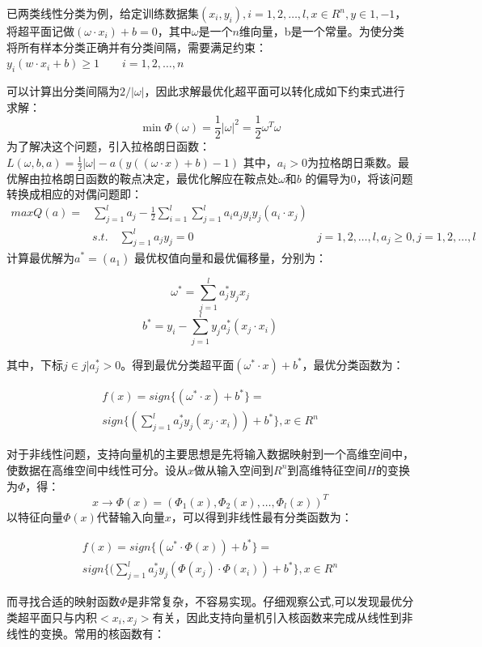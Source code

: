已两类线性分类为例，给定训练数据集\((x_{i},y_{i}),i=1,2,\ldots,l,x\in R^{n},y\in{1,-1}\)，将超平面记做\((\omega\cdot x_{i})+b=0\)，其中\(\omega\)是一个\(n\)维向量，b是一个常量。为使分类将所有样本分类正确并有分类间隔，需要满足约束：\(y_{i}(w\cdot x_{i}+b)\ge 1\quad\quad i = 1,2,\ldots,n\)

可以计算出分类间隔为\(2/\lvert \omega \rvert\)，因此求解最优化超平面可以转化成如下约束式进行求解：
\[\min\Phi(\omega) = \frac{1}{2}\lvert \omega \rvert^{2} = \frac{1}{2}\omega^T\omega\]
为了解决这个问题，引入拉格朗日函数：
\(L(\omega,b,a)=\frac{1}{2}\lvert\omega\rvert-a(y((\omega\cdot x) + b)-1)\)
其中，\(a_{i}>0\)为拉格朗日乘数。最优解由拉格朗日函数的鞍点决定，最优化解应在鞍点处\(\omega\)和\(b\)
的偏导为0，将该问题转换成相应的对偶问题即： \[
\begin{array}{lll}
maxQ(a) = &\sum_{j=1}^{l}a_{j}-\frac{1}{2}\sum_{i=1}^{l}\sum_{j=1}^{l}a_{i}a_{j}y_{i}y_{j}(a_{i}\cdot x_{j}) & \\
& s.t.\quad \sum_{j=1}^{l}a_{j}y_{j}=0 & j=1,2,\ldots,l,a_{j}\ge0,j=1,2,\ldots,l
\end{array}\] 计算最优解为\(a^{*}=(a_{1}^{})\)
最优权值向量和最优偏移量，分别为：

\[\omega^{*} = \sum_{j=1}^{l}a_{j}^*y_{j}x_{j}\]
\[b^{*} = y_{i}-\sum_{j=1}^{l}y_{j}a_{j}^*(x_{j}\cdot x_{i})\]

其中，下标\(j\in{j|a_{j}^{*}>0}\)。得到最优分类超平面\((\omega^*\cdot x) + b^*\)，最优分类函数为：

\[
\begin{array}{ll}
f(x)=sign\{(\omega^{*}\cdot x)+b^*\}=\\
sign\{(\sum_{j=1}^{l}a_{j}^{*}y_{j}(x_{j}\cdot x_{i}))+b^*\},x\in R^{n}
\end{array}
\]

对于非线性问题，支持向量机的主要思想是先将输入数据映射到一个高维空间中，使数据在高维空间中线性可分。设从\(x\)做从输入空间到\(R^{n}\)到高维特征空间\(H\)的变换为\(\Phi\)，得：
\[x\to\Phi(x)=(\Phi_{1}(x),\Phi_{2}(x),\ldots,\Phi_{l}(x))^{T}\]
以特征向量\(\Phi(x)\)代替输入向量\(x\)，可以得到非线性最有分类函数为：

\[
\begin{array}{ll}
f(x)=sign\{(\omega^{*}\cdot \Phi(x))+b^*\}=\\
sign\{(\sum_{j=1}^{l}a_{j}^{*}y_{j}(\Phi(x_{j})\cdot \Phi(x_{i}))+b^*\},x\in R^{n}
\end{array}
\]

而寻找合适的映射函数\(\Phi\)是非常复杂，不容易实现。仔细观察公式,可以发现最优分类超平面只与内积\(< x_{i},x_{j}>\)有关，因此支持向量机引入核函数来完成从线性到非线性的变换。常用的核函数有：

